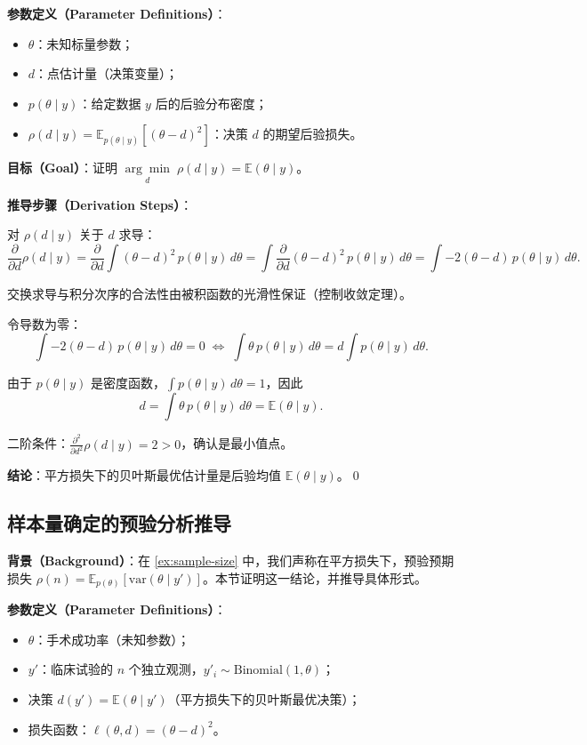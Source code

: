 \textbf{参数定义（Parameter Definitions）}：
\begin{itemize}
  \item $\theta$：未知标量参数；
  \item $d$：点估计量（决策变量）；
  \item $p(\theta \mid y)$：给定数据 $y$ 后的后验分布密度；
  \item $\rho(d \mid y) = \mathbb{E}_{p(\theta\mid y)}[(\theta - d)^2]$：决策 $d$ 的期望后验损失。
\end{itemize}

\textbf{目标（Goal）}：证明 $\underset{d}{\arg\min} \; \rho(d \mid y) = \mathbb{E}(\theta \mid y)$。

\textbf{推导步骤（Derivation Steps）}：

对 $\rho(d \mid y)$ 关于 $d$ 求导：
\[
\frac{\partial}{\partial d} \rho(d \mid y)
= \frac{\partial}{\partial d} \int (\theta - d)^2 \, p(\theta \mid y) \, d\theta
= \int \frac{\partial}{\partial d} (\theta - d)^2 \, p(\theta \mid y) \, d\theta
= \int -2(\theta - d) \, p(\theta \mid y) \, d\theta.
\]

交换求导与积分次序的合法性由被积函数的光滑性保证（控制收敛定理）。

令导数为零：
\[
\int -2(\theta - d) \, p(\theta \mid y) \, d\theta = 0
\;\Longleftrightarrow\;
\int \theta \, p(\theta \mid y) \, d\theta = d \int p(\theta \mid y) \, d\theta.
\]

由于 $p(\theta \mid y)$ 是密度函数，$\int p(\theta \mid y) \, d\theta = 1$，因此
\[
d = \int \theta \, p(\theta \mid y) \, d\theta = \mathbb{E}(\theta \mid y).
\]

二阶条件：$\frac{\partial^2}{\partial d^2} \rho(d \mid y) = 2 > 0$，确认是最小值点。

\textbf{结论}：平方损失下的贝叶斯最优估计量是后验均值 $\mathbb{E}(\theta \mid y)$。\qed

\subsection{样本量确定的预验分析推导}\label{sec:derivation-sample-size}

\textbf{背景（Background）}：在 \cref{ex:sample-size} 中，我们声称在平方损失下，预验预期损失 $\rho(n) = \mathbb{E}_{p(\theta)}[\text{var}(\theta \mid y')]$。本节证明这一结论，并推导具体形式。

\textbf{参数定义（Parameter Definitions）}：
\begin{itemize}
  \item $\theta$：手术成功率（未知参数）；
  \item $y'$：临床试验的 $n$ 个独立观测，$y'_i \sim \text{Binomial}(1, \theta)$；
  \item 决策 $d(y') = \mathbb{E}(\theta \mid y')$（平方损失下的贝叶斯最优决策）；
  \item 损失函数：$\ell(\theta, d) = (\theta - d)^2$。
\end{itemize}


